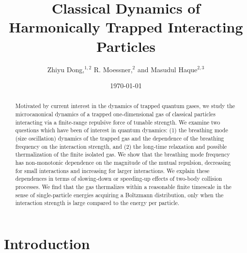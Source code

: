\documentclass[a4paper, onecolumn]{revtex4-1}
\begin{document}
\title{Classical Dynamics of Harmonically Trapped Interacting Particles}

\author{
Zhiyu Dong,$^{1,2}$
R. Moessner,$^2$
and Masudul Haque$^{2,3}$}





\date{\today}
 
 
\begin{abstract}

Motivated by current interest in the dynamics of trapped quantum gases, we study the microcanonical
dynamics of a trapped one-dimensional gas of classical particles interacting via a finite-range
repulsive force of tunable strength.  We examine two questions which have been of interest in
quantum dynamics: (1) the breathing mode (size oscillation) dynamics of the trapped gas and the
dependence of the breathing frequency on the interaction strength, and (2) the long-time relaxation
and possible thermalization of the finite isolated gas.
%
We show that the breathing mode frequency has non-monotonic dependence on the magnitude of the
mutual repulsion, decreasing for small interactions and increasing for larger interactions.  We
explain these dependences in terms of slowing-down or speeding-up effects of two-body collision
processes.  We find that the gas thermalizes within a reasonable finite timescale in the sense of
single-particle energies acquiring a Boltzmann distribution, only when the interaction strength is
large compared to the energy per particle.

  
\end{abstract}

\maketitle


\section{Introduction}
\end{document}
